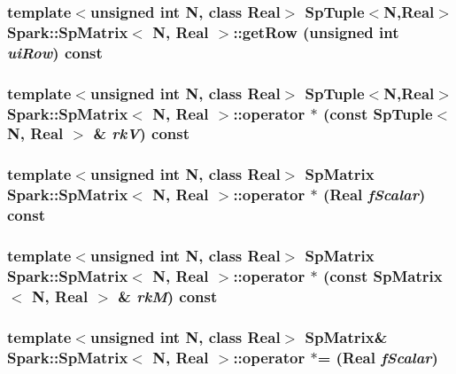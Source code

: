 \subsubsection{\setlength{\rightskip}{0pt plus 5cm}template$<$unsigned int N, class Real$>$ {\bf Sp\-Tuple}$<$N,Real$>$ {\bf Spark::Sp\-Matrix}$<$ N, Real $>$::get\-Row (unsigned int {\em ui\-Row}) const}\label{classSpark_1_1SpMatrix_a9}


\subsubsection{\setlength{\rightskip}{0pt plus 5cm}template$<$unsigned int N, class Real$>$ {\bf Sp\-Tuple}$<$N,Real$>$ {\bf Spark::Sp\-Matrix}$<$ N, Real $>$::operator $\ast$ (const {\bf Sp\-Tuple}$<$ N, Real $>$ \& {\em rk\-V}) const}\label{classSpark_1_1SpMatrix_a30}


\subsubsection{\setlength{\rightskip}{0pt plus 5cm}template$<$unsigned int N, class Real$>$ {\bf Sp\-Matrix} {\bf Spark::Sp\-Matrix}$<$ N, Real $>$::operator $\ast$ (Real {\em f\-Scalar}) const}\label{classSpark_1_1SpMatrix_a23}


\subsubsection{\setlength{\rightskip}{0pt plus 5cm}template$<$unsigned int N, class Real$>$ {\bf Sp\-Matrix} {\bf Spark::Sp\-Matrix}$<$ N, Real $>$::operator $\ast$ (const {\bf Sp\-Matrix}$<$ N, Real $>$ \& {\em rk\-M}) const}\label{classSpark_1_1SpMatrix_a22}


\subsubsection{\setlength{\rightskip}{0pt plus 5cm}template$<$unsigned int N, class Real$>$ {\bf Sp\-Matrix}\& {\bf Spark::Sp\-Matrix}$<$ N, Real $>$::operator $\ast$= (Real {\em f\-Scalar})}\label{classSpark_1_1SpMatrix_a28}


